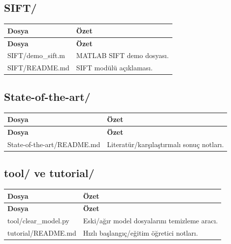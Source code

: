 \documentclass[11pt,a4paper]{article}
\begin{document}
\subsection*{SIFT/}
\begin{longtable}{|p{}|p{}|}
\hline
\textbf{Dosya} & \textbf{Özet} \\
\hline
\endfirsthead
\hline
\textbf{Dosya} & \textbf{Özet} \\
\hline
\endhead

SIFT/demo_sift.m & MATLAB SIFT demo dosyası. \\
\hline
SIFT/README.md & SIFT modülü açıklaması. \\
\hline
\end{longtable}

\subsection*{State-of-the-art/}
\begin{longtable}{|p{}|p{}|}
\hline
\textbf{Dosya} & \textbf{Özet} \\
\hline
\endfirsthead
\hline
\textbf{Dosya} & \textbf{Özet} \\
\hline
\endhead

State-of-the-art/README.md & Literatür/karşılaştırmalı sonuç notları. \\
\hline
\end{longtable}

\subsection*{tool/ ve tutorial/}
\begin{longtable}{|p{}|p{}|}
\hline
\textbf{Dosya} & \textbf{Özet} \\
\hline
\endfirsthead
\hline
\textbf{Dosya} & \textbf{Özet} \\
\hline
\endhead

tool/clear_model.py & Eski/ağır model dosyalarını temizleme aracı. \\
\hline
tutorial/README.md & Hızlı başlangıç/eğitim öğretici notları. \\
\hline
\end{longtable}
\end{document}
